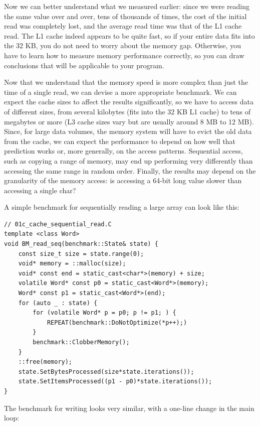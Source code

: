 Now we can better understand what we measured earlier: since we were reading the same value over and over, tens of thousands of times, the cost of the initial read was completely lost, and the average read time was that of the L1 cache read. The L1 cache indeed appears to be quite fast, so if your entire data fits into the 32 KB, you do not need to worry about the memory gap. Otherwise, you have to learn how to measure memory performance correctly, so you can draw conclusions that will be applicable to your program.


Now that we understand that the memory speed is more complex than just the time of a single read, we can devise a more appropriate benchmark. We can expect the cache sizes to affect the results significantly, so we have to access data of different sizes, from several kilobytes (fits into the 32 KB L1 cache) to tens of megabytes or more (L3 cache sizes vary but are usually around 8 MB to 12 MB). Since, for large data volumes, the memory system will have to evict the old data from the cache, we can expect the performance to depend on how well that prediction works or, more generally, on the access patterns. Sequential access, such as copying a range of memory, may end up performing very differently than accessing the same range in random order. Finally, the results may depend on the granularity of the memory access: is accessing a 64-bit long value slower than accessing a single char?

A simple benchmark for sequentially reading a large array can look like this:

\begin{lstlisting}[style=styleCXX]
// 01c_cache_sequential_read.C
template <class Word>
void BM_read_seq(benchmark::State& state) {
	const size_t size = state.range(0);
	void* memory = ::malloc(size);
	void* const end = static_cast<char*>(memory) + size;
	volatile Word* const p0 = static_cast<Word*>(memory);
	Word* const p1 = static_cast<Word*>(end);
	for (auto _ : state) {
		for (volatile Word* p = p0; p != p1; ) {
			REPEAT(benchmark::DoNotOptimize(*p++);)
		}
		benchmark::ClobberMemory();
	}
	::free(memory);
	state.SetBytesProcessed(size*state.iterations());
	state.SetItemsProcessed((p1 - p0)*state.iterations());
}
\end{lstlisting}

The benchmark for writing looks very similar, with a one-line change in the main loop:

